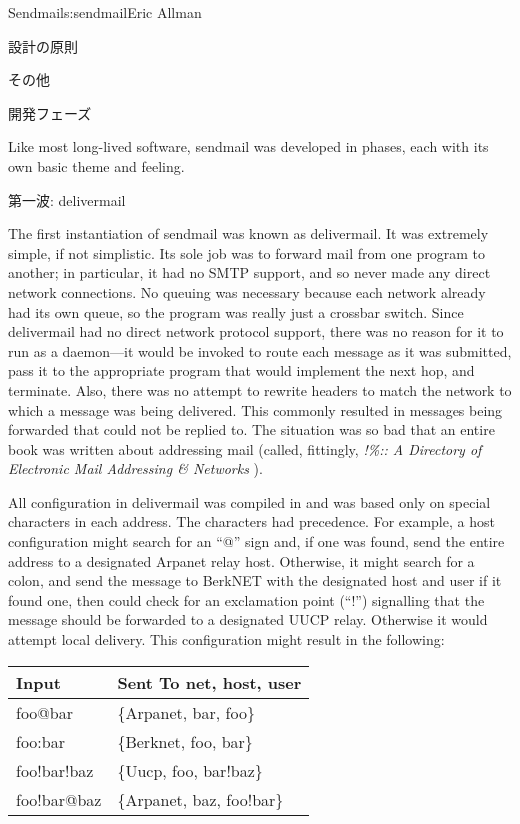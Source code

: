 \begin{aosachapter}{Sendmail}{s:sendmail}{Eric Allman}
\begin{aosasect1}{設計の原則}
\begin{aosasect2}{その他}
\end{aosasect2}

\end{aosasect1}

\begin{aosasect1}{開発フェーズ}

Like most long-lived software, sendmail was developed in phases, each
with its own basic theme and feeling.

\begin{aosasect2}{第一波: delivermail}

The first instantiation of sendmail was known as delivermail. It was
extremely simple, if not simplistic. Its sole job was to forward mail
from one program to another; in particular, it had no SMTP support,
and so never made any direct network connections. No queuing
was necessary because each network already had its own queue, so the
program was really just a crossbar switch. Since delivermail had no
direct network protocol support, there was no reason for it to run as
a daemon---it would be invoked to route each message as it was
submitted, pass it to the appropriate program that would implement the
next hop, and terminate.  Also, there was no attempt to rewrite
headers to match the network to which a message was being
delivered. This commonly resulted in messages being forwarded that
could not be replied to. The situation was so bad that an entire book
was written about addressing mail (called, fittingly,
\emph{!\%\@:: A Directory of Electronic Mail Addressing \& Networks}
\cite{bib:adams:email}).

All configuration in delivermail was compiled in and was based only on
special characters in each address.  The characters had
precedence. For example, a host configuration might search for an
``@'' sign and, if one was found, send the entire address to a
designated Arpanet relay host. Otherwise, it might search for a colon,
and send the message to BerkNET with the designated host and user if
it found one, then could check for an exclamation point (``!'')
signalling that the message should be forwarded to a designated UUCP
relay.  Otherwise it would attempt local delivery. This configuration
might result in the following:

\begin{table}[h!]\centering
\begin{tabular}{|ll|}
\hline
Input & Sent To {net, host, user} \\
\hline
foo@bar & \{Arpanet, bar, foo\} \\
foo:bar & \{Berknet, foo, bar\} \\
foo!bar!baz & \{Uucp, foo, bar!baz\} \\
foo!bar@baz & \{Arpanet, baz, foo!bar\} \\
\hline
\end{tabular}
\end{table}


\end{aosasect2}
\end{aosasect1}
\end{aosachapter}
